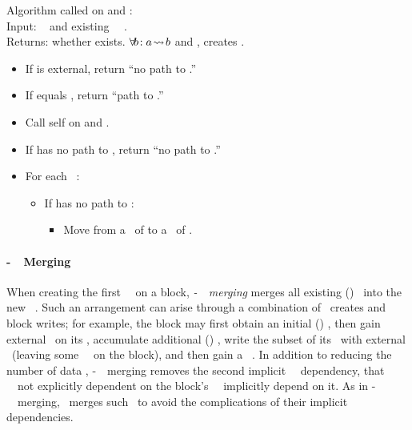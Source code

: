 \noindent Algorithm called on  and :\\
Input: \chdesc\  and existing \nrb\ \chdesc\ .\\
Returns: whether  exists. \(\forall\! b\!: a\! \leadsto\! b\) and , creates .

\begin{itemize}
\item If  is external, return ``no path to .''
\item If  equals , return ``path to .''
\item Call self on  and .
\item If  has no path to , return ``no path to .''
\item For each  \before\ :
  \begin{itemize}
  \item If  has no path to :
    \begin{itemize}
    \item Move  from a \before\ of  to a \before\ of .
    \end{itemize}
  \end{itemize}
\end{itemize}

\paragraph{\Nrb-\Rb\ \ChDesc\ Merging}
\label{sec:chdescs:merge:nrb:hard-soft}

When creating the first \nrb\ \chdesc\ on a block, \emph{\nrb-\rb\
  \chdesc\ merging} merges all existing (\rb) \chdescs\ into the new
\nrb\ \chdesc.
%
Such an arrangement can arise through a combination of \chdesc\ creates
and block writes; 
%
for example, the block may first obtain an initial (\nrb{}) \chdesc,
%
then gain external \afters\ on its \chdesc,
%
accumulate additional (\rb{}) \chdescs,
%
write the subset of its \chdescs\ with external \afters\ (leaving some
\rb\ \chdescs\ on the block),
%
and then gain a \nrb\ \chdesc.
%
In addition to reducing the number of data \chdescs, \nrb-\rb\
\chdesc\ merging removes the second implicit \nrb\ \chdesc\
dependency, that \rb\ \chdescs\ not explicitly dependent on the
block's \nrb\ \chdesc\ implicitly depend on it.
%
As in \nrb-\nrb\ \chdesc\ merging, \Kudos\ merges such \chdescs\ to
avoid the complications of their implicit dependencies.

